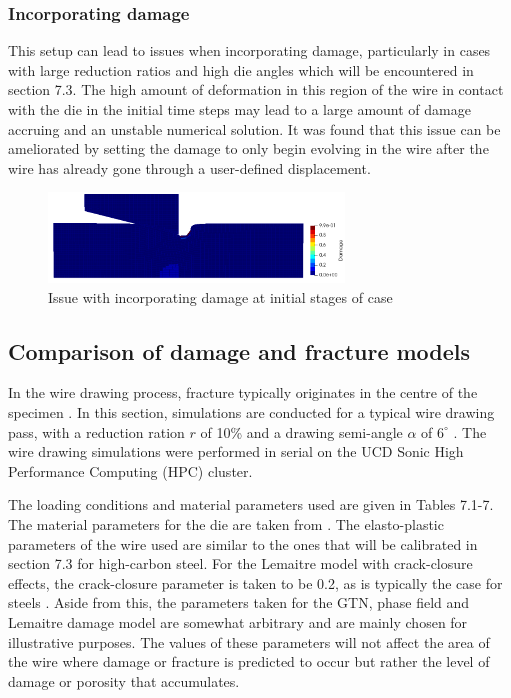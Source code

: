 \documentclass[sn-mathphys,Numbered,draft]{sn-jnl}%
\begin{document}
\subsubsection{Incorporating damage}

This setup can lead to issues when incorporating damage, particularly in cases with large reduction ratios and high die angles which will be encountered in section 7.3. The high amount of deformation in this region of the wire in contact with the die in the initial time steps may lead to a large amount of damage accruing and an unstable numerical solution. It was found that this issue can be ameliorated by setting the damage to only begin evolving in the wire after the wire has already gone through a user-defined displacement. 

\begin{figure}[htb]
\begin{center}
	\includegraphics[width=0.7\textwidth]{./Figures/SimulationAndAnalysis/damageIssue.png}
\caption{Issue with incorporating damage at initial stages of case}
\label{fig:notchedRoundBAr}
\end{center}
\end{figure}

\FloatBarrier

\subsection{Comparison of damage and fracture models}

In the wire drawing process, fracture typically originates in the centre of the specimen \cite{gonzalez_assessment_2018,norasethasopon_prediction_2008,hoffmanner_selection_1971,choi_study_2010}. In this section, simulations are conducted for a typical wire drawing pass, with a reduction ration $r$ of 10\% and a drawing semi-angle $\alpha$ of $6^{\circ}$ \cite{roh_process_2021}. The wire drawing simulations were performed in serial on the UCD Sonic High Performance Computing (HPC) cluster.

The loading conditions and material parameters used are given in Tables 7.1-7. The material parameters for the die are taken from \citet{clancy_improving_2019}. The elasto-plastic parameters of the wire used are similar to the ones that will be calibrated in section 7.3 for high-carbon steel. For the Lemaitre model with crack-closure effects, the crack-closure parameter is taken to be 0.2, as is typically the case for steels \cite{desmorat_modeling_2008,lemaitre_course_1996,bouchard_enhanced_2011}. Aside from this, the parameters taken for the GTN, phase field and Lemaitre damage model are somewhat arbitrary and are mainly chosen for illustrative purposes. The values of these parameters will not affect the area of the wire where damage or fracture is predicted to occur but rather the level of damage or porosity that accumulates.
\end{document}
